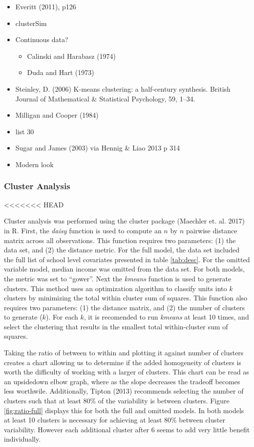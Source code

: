 \documentclass[floatsintext,man]{apa6}
\providecommand{\tightlist}{%
  \setlength{\itemsep}{0pt}\setlength{\parskip}{0pt}}
\theoremstyle{definition}
\theoremstyle{definition}
\theoremstyle{definition}
\theoremstyle{remark}
\begin{document}
\begin{itemize}
\item
  Everitt (2011), p126
\item
  clusterSim
\item
  Continuous data?

  \begin{itemize}
  \tightlist
  \item
    Calinski and Harabasz (1974)
  \item
    Duda and Hart (1973)
  \end{itemize}
\item
  Steinley, D. (2006) K-means clustering: a half-century synthesis.
  British Journal of Mathematical \& Statistical Psychology, 59, 1--34.
\item
  Milligan and Cooper (1984)
\item
  list 30
\item
  Sugar and James (2003) via Hennig \& Liao 2013 p 314
\item
  Modern look
\end{itemize}

\subsubsection{Cluster Analysis}\label{cluster-analysis-1}

\textless{}\textless{}\textless{}\textless{}\textless{}\textless{}\textless{}
HEAD

Cluster analysis was performed using the cluster package (Maechler et.
al. 2017) in R. First, the \emph{daisy} function is used to compute an
\(n\) by \(n\) pairwise distance matrix across all observations. This
function requires two parameters: (1) the data set, and (2) the distance
metric. For the full model, the data set included the full list of
school level covariates presented in table \ref{tab:desc}. For the
omitted variable model, median income was omitted from the data set. For
both models, the metric was set to \enquote{gower}. Next the
\emph{kmeans} function is used to generate clusters. This method uses an
optimization algorithm to classify units into \(k\) clusters by
minimizing the total within cluster sum of squares. This function also
requires two parameters: (1) the distance matrix, and (2) the number of
clusters to generate (\(k\)). For each \(k\), it is recomended to run
\emph{kmeans} at least 10 times, and select the clustering that results
in the smallest total within-cluster sum of squares.

Taking the ratio of between to within and plotting it against number of
clusters creates a chart allowing us to determine if the added
homogeneity of clusters is worth the difficulty of working with a larger
of clusters. This chart can be read as an upsidedown elbow graph, where
as the slope decreases the tradeoff becomes less worthwile.
Additionally, Tipton (2013) recommends selecting the number of clusters
such that at least 80\% of the variability is between clusters. Figure
\ref{fig:ratio-full} displays this for both the full and omitted models.
In both models at least 10 clusters is necessary for achieving at least
80\% between cluster variability. However each additional cluster after
6 seems to add very little benefit individually.
\end{document}
